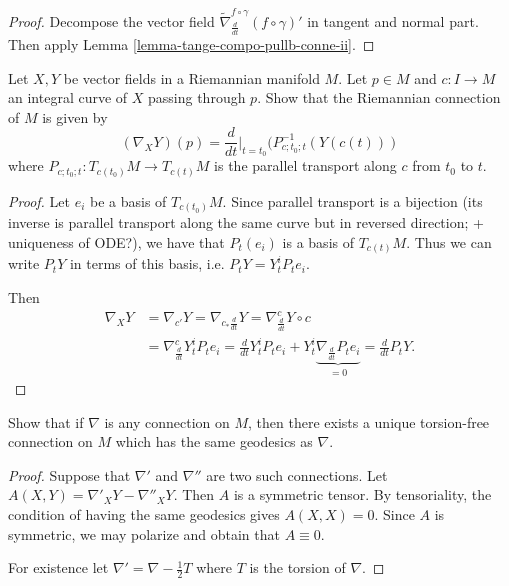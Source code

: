 \documentclass{book}
\begin{document}
\begin{proof}
Decompose the vector field
$\tilde{\nabla}^{f\circ\gamma}_{\frac{d}
{dt}}(f\circ\gamma)'$
in tangent and
normal part. Then apply Lemma
\ref{lemma-tange-compo-pullb-conne-ii}.
\end{proof}

\begin{exercise}
\label{exercise-paral-trans-deter-conne}
\begin{reference}
\cite[Chapter II, Exercise 2]{doc}
\end{reference}
Let $X,Y$ be vector fields in a Riemannian
manifold $M$.
Let $p \in M$ and $c:I \to M$ an integral
curve of $X$ passing through $p$.
Show that the Riemannian connection of $M$ is
given by
$$
(\nabla_XY)(p)
=\frac{d}{dt}\Big|_{t=t_0}
(P^{-1}_{c;t_0;t}(Y(c(t)))
$$
where $P_{c;t_0;t}:T_{c(t_0)}M \to T_{c(t)}M$
is the parallel transport along $c$ from
$t_0$ to $t$.
\end{exercise}

\begin{proof}
Let $e_i$ be a basis of $T_{c(t_0)}M$.
Since parallel transport is a bijection
(its inverse is parallel transport
along the same curve but in reversed
direction;
+ uniqueness of ODE?),
we have that $P_t(e_i)$ is a basis of
$T_{c(t)}M$.
Thus we can write $P_tY$ in terms of this
basis, i.e.
$P_tY = Y^i_tP_te_i$.

Then
$$
\begin{aligned}
\nabla_XY&=\nabla_{c'}Y=\nabla_{c_*\frac{d}
{dt}}Y
=\nabla_{\frac{d}{dt}}^{c}Y \circ c\\
&=\nabla^c_{\frac{d}{dt}}Y^i_tP_te_i
=\frac{d}{dt}Y^i_tP_te_i+
Y^i_t\underbrace{\nabla_{\frac{d}{dt}}P_te_i}
_{=0}
=\frac{d}{dt}P_tY.
\end{aligned}
$$
\end{proof}

\begin{exercise}
\label{exercise-unique-connection-torsion}
Show that if $\nabla$ is any connection
on $M$, then there exists a unique
torsion-free connection on $M$
which has the same geodesics as $\nabla$.
\end{exercise}

\begin{proof}
Suppose that $\nabla'$  and $\nabla''$
are two such connections. Let
$A(X,Y)=\nabla'_XY-\nabla''_XY$.
Then $A$ is a symmetric tensor.
By tensoriality, the condition of
having the same geodesics gives $A(X,X)=0$.
Since $A$ is symmetric, we may polarize
and obtain that $A \equiv 0$.

For existence let
$\nabla'=\nabla-\frac{1}{2}T$
where $T$ is the torsion of $\nabla$.
\end{proof}
\end{document}
